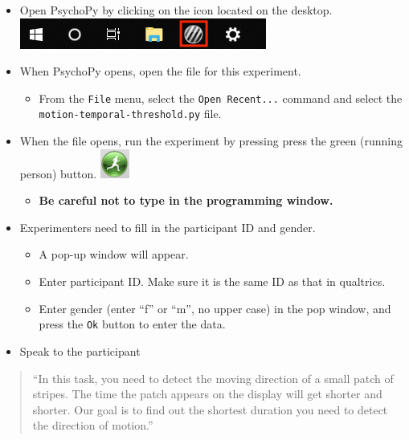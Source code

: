 \documentclass[]{article}
\providecommand{\tightlist}{%
  \setlength{\itemsep}{0pt}\setlength{\parskip}{0pt}}
\begin{document}
\begin{itemize}
\tightlist
\item
  Open PsychoPy by clicking on the icon located on the desktop.
  \includegraphics{images/PsychoPy-1.PNG}\\
\item
  When PsychoPy opens, open the file for this experiment.

  \begin{itemize}
  \tightlist
  \item
    From the \texttt{File} menu, select the \texttt{Open\ Recent...}
    command and select the \texttt{motion-temporal-threshold.py} file.
  \end{itemize}
\item
  When the file opens, run the experiment by pressing press the green
  (running person) button. \includegraphics{images/PPrunningMan.png}

  \begin{itemize}
  \tightlist
  \item
    \textbf{Be careful not to type in the programming window.}
  \end{itemize}
\item
  Experimenters need to fill in the participant ID and gender.

  \begin{itemize}
  \tightlist
  \item
    A pop-up window will appear.
  \item
    Enter participant ID. Make sure it is the same ID as that in
    qualtrics.
  \item
    Enter gender (enter ``f'' or ``m'', no upper case) in the pop
    window, and press the \texttt{Ok} button to enter the data.
  \end{itemize}
\item
  Speak to the participant
\end{itemize}

\begin{quote}
``In this task, you need to detect the moving direction of a small patch
of stripes. The time the patch appears on the display will get shorter
and shorter. Our goal is to find out the shortest duration you need to
detect the direction of motion.''
\end{quote}
\end{document}
